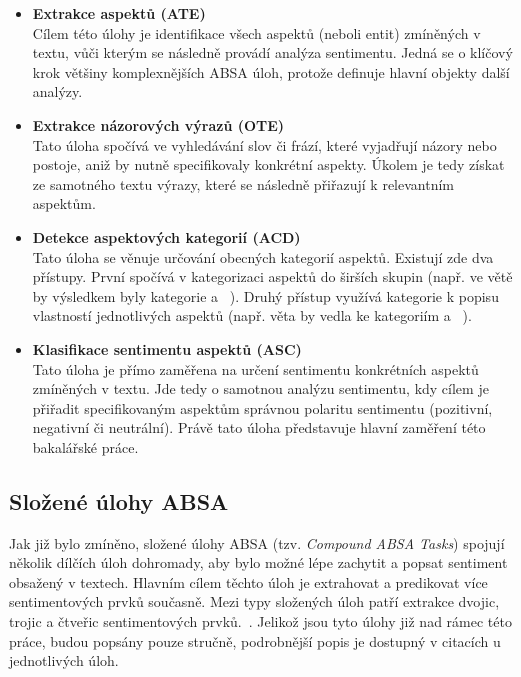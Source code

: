\begin{itemize}
    \item \textbf{Extrakce aspektů (ATE)} \\
    Cílem této úlohy je identifikace všech aspektů (neboli entit) zmíněných v textu, vůči kterým se následně provádí analýza sentimentu. Jedná se o klíčový krok většiny komplexnějších ABSA úloh, protože definuje hlavní objekty další analýzy.~\cite{zhang2022surveyaspectbasedsentimentanalysis}

    \item \textbf{Extrakce názorových výrazů (OTE)} \\
    Tato úloha spočívá ve vyhledávání slov či frází, které vyjadřují názory nebo postoje, aniž by nutně specifikovaly konkrétní aspekty. Úkolem je tedy získat ze samotného textu výrazy, které se následně přiřazují k relevantním aspektům.~\cite{zhang2022surveyaspectbasedsentimentanalysis}

    \item \textbf{Detekce aspektových kategorií (ACD)} \\
    Tato úloha se věnuje určování obecných kategorií aspektů. Existují zde dva přístupy. První spočívá v kategorizaci aspektů do širších skupin (např. ve větě  by výsledkem byly kategorie  a ~\cite{MAO2024102048}). Druhý přístup využívá kategorie k popisu vlastností jednotlivých aspektů (např. věta  by vedla ke kategoriím  a ~\cite{chebolu-etal-2024-oats}).

    \item \textbf{Klasifikace sentimentu aspektů (ASC)} \\
    Tato úloha je přímo zaměřena na určení sentimentu konkrétních aspektů zmíněných v textu. Jde tedy o samotnou analýzu sentimentu, kdy cílem je přiřadit specifikovaným aspektům správnou polaritu sentimentu (pozitivní, negativní či neutrální). Právě tato úloha představuje hlavní zaměření této bakalářské práce.~\cite{zhang2022surveyaspectbasedsentimentanalysis}
\end{itemize}

\subsection{Složené úlohy ABSA}
Jak již bylo zmíněno, složené úlohy ABSA (tzv. \emph{Compound ABSA Tasks}) spojují několik dílčích úloh dohromady, aby bylo možné lépe zachytit a popsat sentiment obsažený v textech. Hlavním cílem těchto úloh je extrahovat a predikovat více sentimentových prvků současně. Mezi typy složených úloh patří extrakce dvojic, trojic a čtveřic sentimentových prvků.~\cite{MAO2024102048}. Jelikož jsou tyto úlohy již nad rámec této práce, budou popsány pouze stručně, podrobnější popis je dostupný v citacích u jednotlivých úloh.

